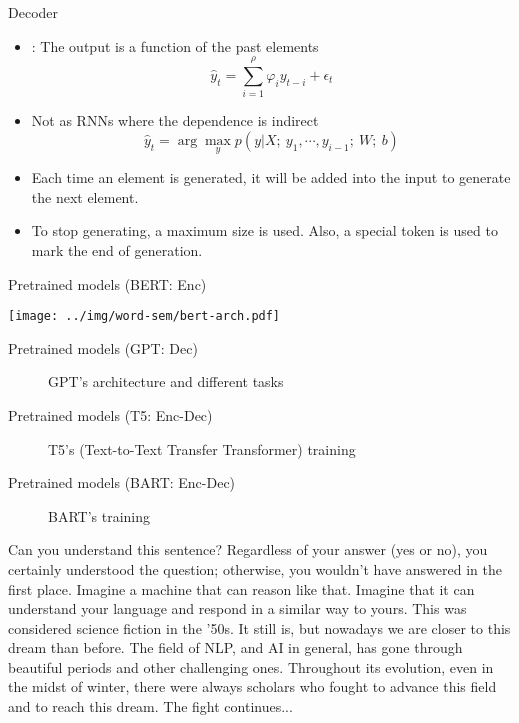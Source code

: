 \documentclass{KBook}
\begin{document}
Decoder
	\begin{itemize}
		\item {}: The output is a  function of the past elements
		\[\hat{y}_t = \sum_{i = 1}^{\rho} \varphi_{i} y_{t-i} + \epsilon_t\]
		\item Not as RNNs where the dependence is indirect
		\[\hat{y}_t = \arg\max_y p(y | X;\ y_1, \cdots, y_{i-1};\ W;\ b)\]
		\item Each time an element is generated, it will be added into the input to generate the next element.
		\item To stop generating, a maximum size is used. Also, a special token is used to mark the end of generation.
	\end{itemize}

Pretrained models (BERT: Enc) \cite{devlin-etal-2019-bert}
	\begin{center}
		\texttt{[image: ../img/word-sem/bert-arch.pdf]}
	\end{center}

Pretrained models (GPT: Dec) \cite{radford2018improving}
	\begin{figure}[htbp]
		\caption{GPT's architecture and different tasks \cite{radford2018improving}}
	\end{figure}

Pretrained models (T5: Enc-Dec) \cite{T5}
	\begin{figure}[htbp]
		\caption{T5's (Text-to-Text Transfer Transformer) training \cite{T5}}
	\end{figure}

Pretrained models (BART: Enc-Dec) \cite{bart}
	\begin{figure}[htbp]
		\centering
		\caption{BART's training \cite{bart}}
	\end{figure}




\begin{discussion}
	
	Can you understand this sentence? Regardless of your answer (yes or no), you certainly understood the question; otherwise, you wouldn't have answered in the first place. Imagine a machine that can reason like that. Imagine that it can understand your language and respond in a similar way to yours. This was considered science fiction in the '50s. It still is, but nowadays we are closer to this dream than before. The field of NLP, and AI in general, has gone through beautiful periods and other challenging ones. Throughout its evolution, even in the midst of winter, there were always scholars who fought to advance this field and to reach this dream. The fight continues...
	
	
\end{discussion}


\ifx\wholebook\relax\else
% 
% 
	
\end{document}
